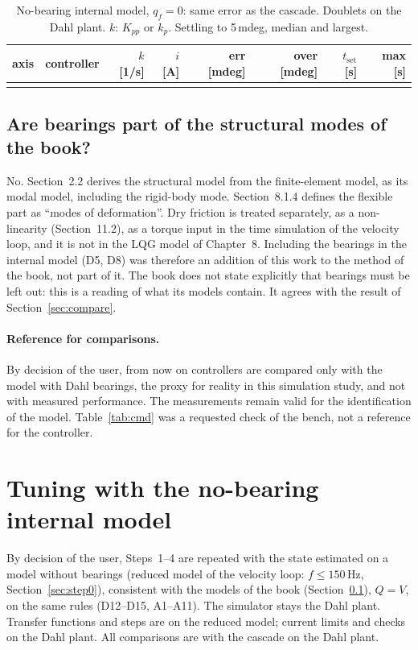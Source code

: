 \documentclass[10pt,a4paper]{article}
\numberwithin{equation}{section}
\begin{document}
\begin{table}[H]\centering\footnotesize\setlength{\tabcolsep}{4pt}
\caption{No-bearing internal model, $q_f=0$: same error as the cascade. Doublets on the Dahl plant. $k$: $K_{pp}$ or $k_p$. Settling to 5\,mdeg, median and largest.}\label{tab:equiv}
\begin{tabular}{lL{6.4cm}rrrrrr}\toprule
axis & controller & $k$ [1/s] & $i$ [A] & err [mdeg] & over [mdeg] & $t_\mathrm{set}$ [s] & max [s] \\ \midrule
\\ \bottomrule
\end{tabular}\end{table}

\subsection{Are bearings part of the structural modes of the book?}\label{sec:book_bearings}
No. Section~2.2 derives the structural model from the finite-element model, as its modal model, including the rigid-body mode. Section~8.1.4 defines the flexible part as ``modes of deformation''. Dry friction is treated separately, as a non-linearity (Section~11.2), as a torque input in the time simulation of the velocity loop, and it is not in the LQG model of Chapter~8. Including the bearings in the internal model (D5, D8) was therefore an addition of this work to the method of the book, not part of it. The book does not state explicitly that bearings must be left out: this is a reading of what its models contain. It agrees with the result of Section~\ref{sec:compare}.

\paragraph{Reference for comparisons.} By decision of the user, from now on controllers are compared only with the model with Dahl bearings, the proxy for reality in this simulation study, and not with measured performance. The measurements remain valid for the identification of the model. Table~\ref{tab:cmd} was a requested check of the bench, not a reference for the controller.

\section{Tuning with the no-bearing internal model}\label{sec:nb}
By decision of the user, Steps~1--4 are repeated with the state estimated on a model without bearings (reduced model of the velocity loop: $f\leq150$\,Hz, Section~\ref{sec:step0}), consistent with the models of the book (Section~\ref{sec:book_bearings}), $Q=V$, on the same rules (D12--D15, A1--A11). The simulator stays the Dahl plant. Transfer functions and steps are on the reduced model; current limits and checks on the Dahl plant. All comparisons are with the cascade on the Dahl plant.
\end{document}
